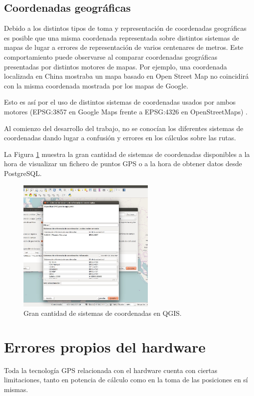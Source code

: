 \subsection{Coordenadas geográficas}
Debido a los distintos tipos de toma y representación de coordenadas geográficas es posible que una misma coordenada representada sobre distintos sistemas de mapas de lugar a errores de representación de varios centenares de metros. Este comportamiento puede observarse al comparar coordenadas geográficas presentadas por distintos motores de mapas. Por ejemplo, una coordenada localizada en China mostraba un mapa basado en Open Street Map no coincidirá con la misma coordenada mostrada por los mapas de Google.

Esto es así por el uso de distintos sistemas de coordenadas usados por ambos motores (EPSG:3857 en Google Maps frente a EPSG:4326 en OpenStreetMaps) \cite{epsg:wiki}.

Al comienzo del desarrollo del trabajo, no se conocían los diferentes sistemas de coordenadas dando lugar a confusión y errores en los cálculos sobre las rutas.

La Figura \ref{coordenadas} muestra la gran cantidad de sistemas de coordenadas disponibles a la hora de visualizar un fichero de puntos GPS o a la hora de obtener datos desde PostgreSQL.


\begin{figure}[h]
  \centering
    \includegraphics[width=0.6\textwidth]{../img/poi/qgis.jpg}
  \caption{Gran cantidad de sistemas de coordenadas en QGIS.}
  \label{coordenadas}
\end{figure}

\section{Errores propios del hardware}
Toda la tecnología GPS relacionada con el hardware cuenta con ciertas limitaciones, tanto en potencia de cálculo como en la toma de las posiciones en sí mismas.

